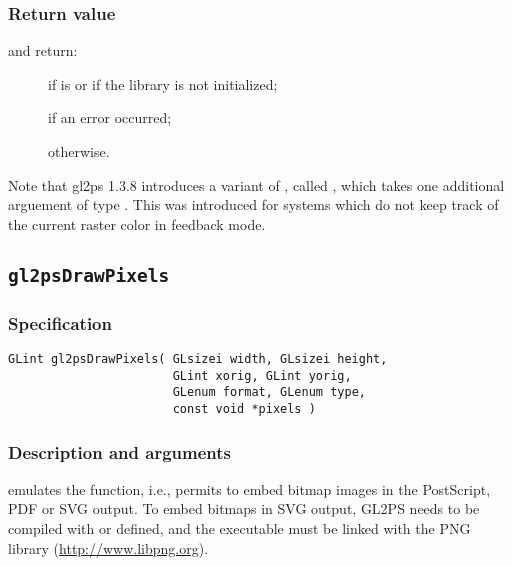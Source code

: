 \subsubsection{Return value}

\noindent{} and  return:
\begin{description}
\item[] if  is  or if the
library is not initialized;
\item[] if an error occurred;
\item[] otherwise.
\end{description}

Note that gl2ps 1.3.8 introduces a variant of , called
, which takes one additional arguement of type
. This was introduced for systems which do not keep track of
the current raster color in feedback mode.


\subsection{\texttt{gl2psDrawPixels}}
\label{sec:gl2psDrawPixels}

\subsubsection{Specification}

\begin{verbatim}
GLint gl2psDrawPixels( GLsizei width, GLsizei height,
                       GLint xorig, GLint yorig,
                       GLenum format, GLenum type,
                       const void *pixels )
\end{verbatim}

\subsubsection{Description and arguments}

 emulates the  function, i.e.,
permits to embed bitmap images in the PostScript, PDF or SVG output.
To embed bitmaps in SVG output, GL2PS needs to be compiled with
 or  defined, and the executable
must be linked with the PNG library (\url{http://www.libpng.org}).

